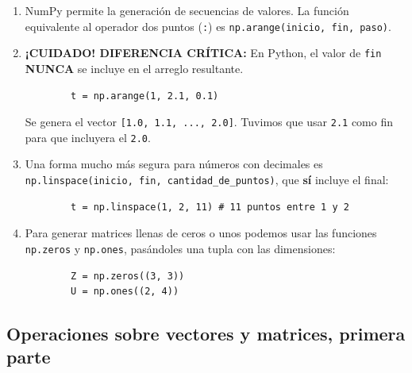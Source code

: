 \begin{enumerate}
	\item NumPy permite la generación de secuencias de valores. La función equivalente al operador dos puntos (\texttt{:}) es \texttt{np.arange(inicio, fin, paso)}.
	\item \textbf{¡CUIDADO! DIFERENCIA CRÍTICA:} En Python, el valor de \texttt{fin} \textbf{NUNCA} se incluye en el arreglo resultante.
	\begin{verbatim}
		t = np.arange(1, 2.1, 0.1)
	\end{verbatim}
	Se genera el vector \texttt{[1.0, 1.1, ..., 2.0]}. Tuvimos que usar \texttt{2.1} como fin para que incluyera el \texttt{2.0}.
	
	\item Una forma mucho más segura para números con decimales es \texttt{np.linspace(inicio, fin, cantidad\_de\_puntos)}, que \textbf{sí} incluye el final:
	\begin{verbatim}
		t = np.linspace(1, 2, 11) # 11 puntos entre 1 y 2
	\end{verbatim}
	
	\item Para generar matrices llenas de ceros o unos podemos usar las funciones \texttt{np.zeros} y \texttt{np.ones}, pasándoles una tupla con las dimensiones:
	\begin{verbatim}
		Z = np.zeros((3, 3))
		U = np.ones((2, 4))
	\end{verbatim}
\end{enumerate}

\subsection{Operaciones sobre vectores y matrices, primera parte}

